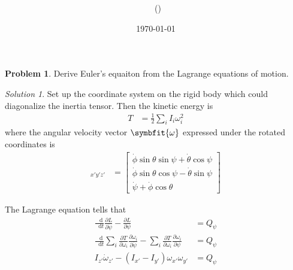 \documentclass[twoside,11pt]{article}
\title{{\lms \Code \ \Ass}}
\author{\lms \name \ (\href{mailto:\mail}{\mail})}
\date{\sffamily \today}
\makeatletter
\newcommand{\lms}{\fontfamily{lmss}\selectfont} %
\renewcommand*\d{\mathop{}\!\mathrm{d}}
\theoremstyle{definition}
\newtheorem{problem}{\lms Problem}
\theoremstyle{remark}
\newtheorem*{solution}{Solution}
\renewcommand{\maketitle}{\bgroup\setlength{\parindent}{0pt}
\begin{flushleft}
  \textbf{\Large\@title}

  \@author
\end{flushleft}\egroup
}
\makeatother
\begin{document}
\maketitle
\thispagestyle{title}

\begin{problem}
Derive Euler's equaiton from the Lagrange equations of motion.
\end{problem}
\begin{solution}
Set up the coordinate system on the rigid body which could diagonalize the
inertia tensor.
Then the kinetic energy is
\begin{align*}
    T &= \frac{1}{2}\sum_i I_i\omega_i^2
\end{align*}
where the angular velocity vector $\symbfit{\omega}$ expressed under the rotated 
coordinates is
\begin{align*}
    [\symbfit{\omega}]_{x'y'z'} &= \begin{bmatrix}
        \dot\phi\sin\theta\sin\psi + \dot\theta\cos\psi \\
        \dot\phi\sin\theta\cos\psi - \dot\theta\sin\psi \\
        \dot\psi + \dot\phi\cos\theta
    \end{bmatrix}
\end{align*}

The Lagrange equation tells that
\begin{align*}
    \frac{\d}{\d t}\frac{\partial L}{\partial\dot\psi}
    -\frac{\partial L}{\partial\psi} &= Q_\psi\\
    \frac{\d}{\d t}\sum_i\frac{\partial T}{\partial\omega_i}\frac{\partial\omega_i}{\partial\dot\psi}
    -\sum_i\frac{\partial T}{\partial\omega_i}\frac{\partial\omega_i}{\partial\psi} &= Q_\psi\\
    I_{z'}\dot \omega_{z'} - (I_{x'} - I_{y'})\omega_{x'}\omega_{y'} &= Q_\psi
\end{align*}


\end{solution}
\end{document}
